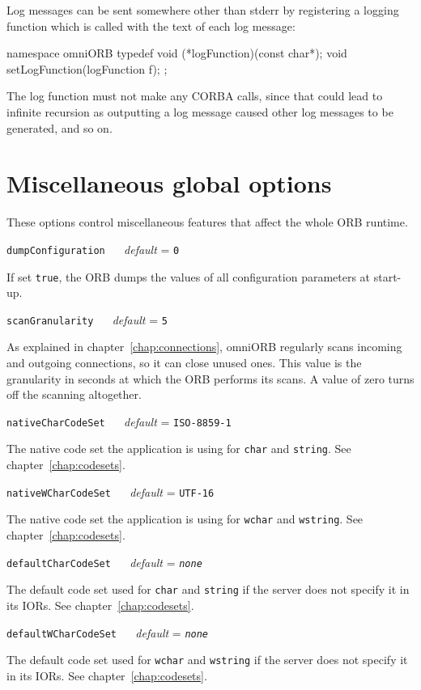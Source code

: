 \documentclass[11pt,oneside,a4paper]{book}
\makeatletter
\newcommand{\type}[1]{\texttt{#1}}
\newcommand{\code}[1]{\texttt{#1}}
\newcommand{\confopt}[2]
  {\vspace{\baselineskip}\par\noindent\code{#1} ~~ \textit{default} =
   \code{#2}}
\renewcommand{\confopt}[2]
  {\vspace{\baselineskip}\par\noindent\code{#1} ~~ \textit{default} =
   \code{#2}\\[-1ex]\@afterheading}
\makeatother
\begin{document}
\noindent
Log messages can be sent somewhere other than stderr by registering a
logging function which is called with the text of each log message:

\begin{cxxlisting}
namespace omniORB {
  typedef void (*logFunction)(const char*);
  void setLogFunction(logFunction f);
};
\end{cxxlisting}

\noindent
The log function must not make any CORBA calls, since that could lead
to infinite recursion as outputting a log message caused other log
messages to be generated, and so on.




\section{Miscellaneous global options}

These options control miscellaneous features that affect the whole ORB
runtime.

\confopt{dumpConfiguration}{0}

If set \code{true}, the ORB dumps the values of all configuration
parameters at start-up.


\confopt{scanGranularity}{5}

As explained in chapter~\ref{chap:connections}, omniORB regularly
scans incoming and outgoing connections, so it can close unused
ones. This value is the granularity in seconds at which the ORB
performs its scans. A value of zero turns off the scanning altogether.


\confopt{nativeCharCodeSet}{ISO-8859-1}

The native code set the application is using for \type{char} and
\type{string}. See chapter~\ref{chap:codesets}.


\confopt{nativeWCharCodeSet}{UTF-16}

The native code set the application is using for \type{wchar} and
\type{wstring}. See chapter~\ref{chap:codesets}.


\confopt{defaultCharCodeSet}{\textit{none}}

The default code set used for \type{char} and \type{string} if the
server does not specify it in its IORs. See
chapter~\ref{chap:codesets}.


\confopt{defaultWCharCodeSet}{\textit{none}}

The default code set used for \type{wchar} and \type{wstring} if the
server does not specify it in its IORs. See
chapter~\ref{chap:codesets}.
\end{document}
